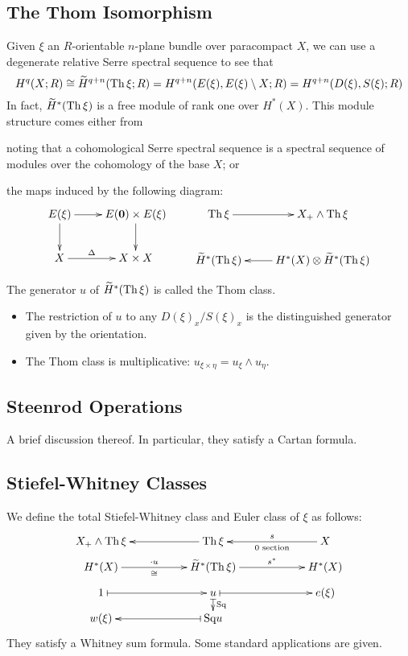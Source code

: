 \documentclass[11pt]{article}
\begin{document}
\subsection{The Thom Isomorphism}
Given $\xi$ an $R$-orientable $n$-plane bundle over paracompact $X$, we can use a degenerate relative Serre spectral sequence to see that
\[{H}^{q}(X;R)\cong \widetilde{H}^{q+n}(\operatorname{Th}\xi;R)={H}^{q+n}(E(\xi),E(\xi)\setminus X;R)={H}^{q+n}(D(\xi),S(\xi);R)\]
In fact, $\widetilde{H}^{*}(\operatorname{Th}\xi)$ is a free module of rank one over ${H}^{*}(X)$. This module structure comes either from
\begin{itemise}
\item noting that a cohomological Serre spectral sequence is a spectral sequence of modules over the cohomology of the base $X$; or
\item the maps induced by the following diagram:
\[\xymatrix{
E(\xi)
\ar[r]
\ar[d]
&%
E(\textbf{0})\times E(\xi)
\ar[d]
\\%
X
\ar[r]^-{\Delta}
&%
X\times X
}\qquad 
\xymatrix{
\Thom \xi
\ar[r]
&%
X_+\wedge \Thom\xi
\\%
\widetilde{H}^{*}(\Thom\xi)
&%
{H^*(X)}\otimes{\widetilde{H}^{*}(\Thom\xi)}
\ar[l]
}\]
\end{itemise} 
The generator $u$ of $\widetilde{H}^{*}(\operatorname{Th}\xi)$ is called the Thom class.
\begin{itemize}\squishlist
\item The restriction of $u$ to any $D(\xi)_x/S(\xi)_x$ is the distinguished generator given by the orientation.
\item The Thom class is multiplicative: $u_{\xi\times\eta}=u_\xi\wedge u_\eta$.
\end{itemize}
\subsection{Steenrod Operations}
A brief discussion thereof. In particular, they satisfy a Cartan formula.
\subsection{Stiefel-Whitney Classes}
We define the total Stiefel-Whitney class and Euler class of $\xi$ as follows:
\[\xymatrix@R=.805cm@C=3.5cm@!0{
X_+\wedge \Thom\xi&
\Thom\xi
\ar[l]
&
X
\ar[l]^-{\textup{0 section}}_-s
\\
H^*(X)
\ar[r]^-{\cdot u}_-{\cong}
&%
\widetilde{H}^{*}(\Thom\xi)
\ar[r]^-{s^*}
&
{H}^{*}(X)
\\%
1
\ar@{|->}[r]
&%
u
\ar@{|->}[d]^-{\Squ}
\ar@{|->}[r]
&
e(\xi)
\\%
w(\xi)
&%
\Squ u\ar@{|->}[l]%
}\]
They satisfy a Whitney sum formula. Some standard applications are given.
\end{document}
